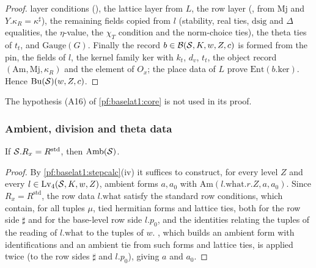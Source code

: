 \begin{proof}
layer conditions (), the lattice
layer from $L$, the row layer (, from $\mathrm{Mj}$
and $Y.\kappa_R=\kappa^\sharp$), the remaining fields copied from $l$ (stability, real ties,
$\mathrm{dsig}$ and $\Delta$ equalities, the $\eta$-value, the $\chi_T$ condition and the norm-choice ties),
the theta ties of $t_t$, and $\mathrm{Gauge}(G)$. Finally the record $b\in\mathcal{B}(\mathcal S,K,w,Z,c)$
is formed from the pin, the
fields of $l$, the kernel family $\mathrm{ker}$ with $k_t$, $d_v$, $t_t$, the object record
$(\mathrm{Am},\mathrm{Mj},\kappa_R)$ and the element of $O_x$; the place data of $L$ prove
$\mathrm{Ent}(b.\mathrm{ker})$. Hence $\mathrm{Bu}(\mathcal S)(w,Z,c)$.
\end{proof}

\begin{remark}\label{pf:baselat1:rem:core}
The hypothesis (A16) of \cref{pf:baselat1:core} is not used in its proof.
\end{remark}

\subsubsection{Ambient, division and theta data}

\begin{proposition}\label{pf:baselat1:amb}
If $\mathcal S.R_x=R^{\mathrm{std}}$, then $\mathrm{Amb}(\mathcal S)$.
\end{proposition}

\begin{proof}
By \cref{pf:baselat1:stepcalc}(iv) it suffices to construct, for every level $Z$ and every
$l\in\mathrm{Lv}_4(\mathcal S,K,w,Z)$, ambient forms $a,a_0$ with $\mathrm{Am}(l.\mathrm{what}.r.Z,a,a_0)$.
Since $R_x=R^{\mathrm{std}}$, the row data $l.\mathrm{what}$ satisfy the standard row conditions, which contain,
for all tuples $\mu$, tied hermitian forms and lattice ties, both for the row side $\sharp$ and for the
base-level row side $l.p_0$, and the identities relating the tuples of the reading of $l.\mathrm{what}$ to the
tuples of $w$. , which builds an ambient form with identifications
and an ambient tie from such forms and lattice ties, is applied twice (to the row sides $\sharp$ and $l.p_0$),
giving $a$ and $a_0$.
\end{proof}

